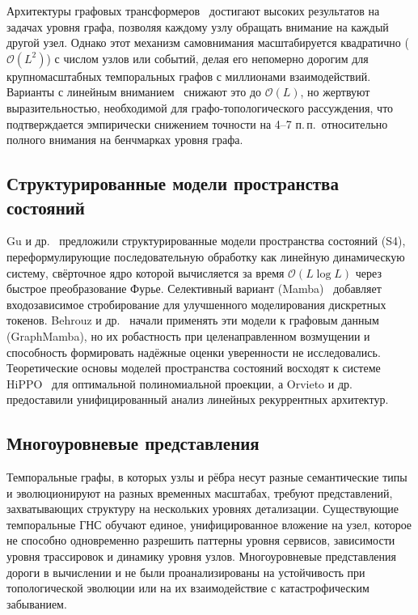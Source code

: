 Архитектуры графовых трансформеров~\cite{Vaswani2017,Ying2021} достигают высоких результатов на задачах уровня графа, позволяя каждому узлу обращать внимание на каждый другой узел. Однако этот механизм самовнимания масштабируется квадратично ($\mathcal{O}(L^2)$) с числом узлов или событий, делая его непомерно дорогим для крупномасштабных темпоральных графов с миллионами взаимодействий. Варианты с линейным вниманием~\cite{Katharopoulos2020} снижают это до $\mathcal{O}(L)$, но жертвуют выразительностью, необходимой для графо-топологического рассуждения, что подтверждается эмпирически снижением точности на 4--7 п.\,п.\ относительно полного внимания на бенчмарках уровня графа.

\subsection{Структурированные модели пространства состояний}

Gu и др.~\cite{Gu2022} предложили структурированные модели пространства состояний (S4), переформулирующие последовательную обработку как линейную динамическую систему, свёрточное ядро которой вычисляется за время $\mathcal{O}(L\log L)$ через быстрое преобразование Фурье. Селективный вариант (Mamba)~\cite{Dao2024} добавляет входозависимое стробирование для улучшенного моделирования дискретных токенов. Behrouz и др.~\cite{Behrouz2024graphmamba} начали применять эти модели к графовым данным (GraphMamba), но их робастность при целенаправленном возмущении и способность формировать надёжные оценки уверенности не исследовались. Теоретические основы моделей пространства состояний восходят к системе HiPPO~\cite{Gu2020hippo} для оптимальной полиномиальной проекции, а Orvieto и др.~\cite{Orvieto2023} предоставили унифицированный анализ линейных рекуррентных архитектур.

\subsection{Многоуровневые представления}

Темпоральные графы, в которых узлы и рёбра несут разные семантические типы и эволюционируют на разных временных масштабах, требуют представлений, захватывающих структуру на нескольких уровнях детализации. Существующие темпоральные ГНС обучают единое, унифицированное вложение на узел, которое не способно одновременно разрешить паттерны уровня сервисов, зависимости уровня трассировок и динамику уровня узлов. Многоуровневые представления дороги в вычислении и не были проанализированы на устойчивость при топологической эволюции или на их взаимодействие с катастрофическим забыванием.

